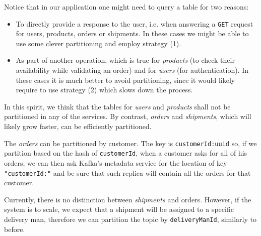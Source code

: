 Notice that in our application one might need to query a table for two reasons:
\begin{itemize}
    \item To directly provide a response to the user, i.e. when answering a \texttt{GET} request for users, products, orders or shipments. In these cases we might be able to use some clever partitioning and employ strategy (1).
    \item As part of another operation, which is true for \emph{products} (to check their availability while validating an order) and for \emph{users} (for authentication). In these cases it is much better to avoid partitioning, since it would likely require to use strategy (2) which slows down the process.
\end{itemize}
In this spirit, we think that the tables for \emph{users} and \emph{products} shall not be partitioned in any of the services. By contrast, \emph{orders} and \emph{shipments}, which will likely grow faster, can be efficiently partitioned.

The \emph{orders} can be partitioned by customer. The key is \texttt{customerId:uuid} so, if we partition based on the hash of \texttt{customerId}, when a customer asks for all of his orders, we can then ask Kafka's metadata service for the location of key \texttt{"customerId:"} and be sure that such replica will contain all the orders for that customer.

Currently, there is no distinction between \emph{shipments} and orders. However, if the system is to scale, we expect that a shipment will be assigned to a specific delivery man, therefore we can partition the topic by \texttt{deliveryManId}, similarly to before.